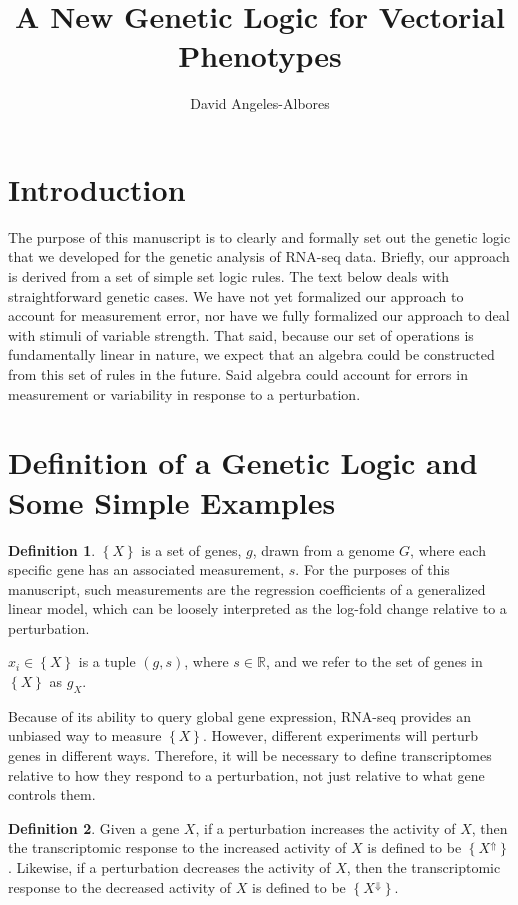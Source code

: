 \documentclass{article}
\title{A New Genetic Logic for Vectorial Phenotypes}
\author{David Angeles-Albores}
\newcommand{\transcr}[1]{\left \{ #1 \right \}}
\theoremstyle{definition}
\newtheorem{definition}{Definition}[section]
\begin{document}
\maketitle{}
\tableofcontents

\section{Introduction}
\label{sec:intro}

The purpose of this manuscript is to clearly and formally set out the genetic logic that we developed for the genetic analysis of RNA-seq data. Briefly, our approach is derived from a set of simple set logic rules. The text below deals with straightforward genetic cases. We have not yet formalized our approach to account for measurement error, nor have we fully formalized our approach to deal with stimuli of variable strength. That said, because our set of operations is fundamentally linear in nature, we expect that an algebra could be constructed from this set of rules in the future. Said algebra could account for errors in measurement or variability in response to a perturbation.

\section{Definition of a Genetic Logic and Some Simple Examples}

\begin{definition}
  $\transcr{X}$ is a set of genes, $g$, drawn from a genome $G$, where each specific gene has an associated measurement, $s$. For the purposes of this manuscript, such measurements are the regression coefficients of a generalized linear model, which can be loosely interpreted as the log-fold change relative to a perturbation.

  $x_i \in \left \{X \right \}$ is a tuple $(g, s)$, where $s \in \mathbb{R}$, and we refer to the set of genes in $\transcr{X}$ as $g_X$.
\end{definition}

Because of its ability to query global gene expression, RNA-seq provides an unbiased way to measure $\transcr{X}$. However, different experiments will perturb genes in different ways. Therefore, it will be necessary to define transcriptomes relative to how they respond to a perturbation, not just relative to what gene controls them.

\begin{definition}
  Given a gene $X$, if a perturbation increases the activity of $X$, then the transcriptomic response to the increased activity of $X$ is defined to be $\transcr{X^\Uparrow}$. Likewise, if a perturbation decreases the activity of $X$, then the transcriptomic response to the decreased activity of $X$ is defined to be $\transcr{X^\Downarrow}$.
\end{definition}
\end{document}
